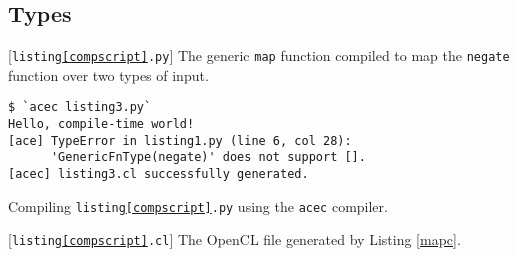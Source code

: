 \documentclass[10pt,preprint]{sigplanconf}
\begin{document}
{\subsection{Types}
\begin{codelisting}

\caption{[\texttt{listing\ref{compscript}.py}] The generic \texttt{map} function compiled to map the \texttt{negate} function over two  types of input.}
\label{compscript}
\end{codelisting}
\begin{codelisting}
\begin{lstlisting}[style=Bash]
$ `acec listing3.py`
Hello, compile-time world!
[ace] TypeError in listing1.py (line 6, col 28): 
      'GenericFnType(negate)' does not support [].
[acec] listing3.cl successfully generated.
\end{lstlisting}
\caption{Compiling \texttt{listing\ref{compscript}.py} using the \texttt{acec} compiler.}
\label{mapc}
\end{codelisting}
\begin{codelisting}

\caption{[\texttt{listing\ref{compscript}.cl}] The OpenCL file generated by Listing \ref{mapc}.}
\label{mapout}
\end{codelisting}

}
\end{document}
